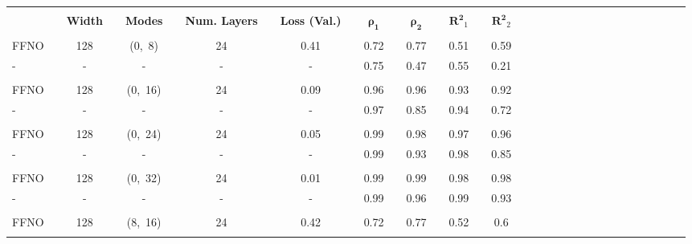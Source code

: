 \bgroup
\def\arraystretch{1.5}
\begin{table}[H]
\vspace{-0.5cm}
\hspace{-1.2cm}
\begin{tabular}{llclclclclclclclclclclclclclclcl}
\Xhline{1.5pt}\\[-1.5em]
\textbf{} &  & \textbf{Width} &  & \textbf{Modes} &  & \textbf{Num. Layers} &  & \textbf{Loss (Val.)} &  & $\boldsymbol{\rho_{1}}$ &  & $\boldsymbol{\rho_{2}}$ &  & $\boldsymbol{R^2}_1$ &  & $\boldsymbol{R^2}_2$ \\[0.4em] 
\cline{1-1} \cline{3-3} \cline{5-5} \cline{7-7} \cline{9-9} \cline{11-11} \cline{13-13} \cline{15-15} \cline{17-17} \\[-1.4em]
FFNO        &  & 128      &  & (0,\ 8)       &  & 24       &  & 0.41          &  & 0.72         &  & 0.77         &  & 0.51       &  & 0.59        \\ \rowcolor{Gray}
-     		&  & -        &  & 	-		     &  & -        &  & -              &  & 0.75         &  & 0.47         &  & 0.55       &  & 0.21        \\  
\hline \\[-1.4em]
FFNO        &  & 128      &  & (0,\ 16)      &  & 24       &  & 0.09          &  & 0.96         &  & 0.96         &  & 0.93       &  & 0.92        \\ \rowcolor{Gray}
-     		&  & -        &  & 	-		     &  & -        &  & -              &  & 0.97         &  & 0.85         &  & 0.94       &  & 0.72         \\  
\hline \\[-1.4em]
FFNO        &  & 128      &  & (0,\ 24)      &  & 24       &  & 0.05          &  & 0.99         &  & 0.98         &  & 0.97       &  & 0.96        \\ \rowcolor{Gray}
-     		&  & -        &  & 	-		     &  & -        &  & -              &  & 0.99         &  & 0.93         &  & 0.98       &  & 0.85        \\  
\hline \\[-1.4em]
FFNO        &  & 128      &  & (0,\ 32)      &  & 24       &  & 0.01          &  & 0.99         &  & 0.99         &  & 0.98       &  & 0.98        \\ \rowcolor{Gray}
-     		&  & -        &  & 	-		     &  & -        &  & -              &  & 0.99         &  & 0.96         &  & 0.99       &  & 0.93        \\  
\hline \\[-1.4em]
FFNO        &  & 128      &  & (8,\ 16)      &  & 24       &  & 0.42          &  & 0.72         &  & 0.77         &  & 0.52       &  & 0.6        \\ \rowcolor{Gray}

\end{tabular}
\end{table}
